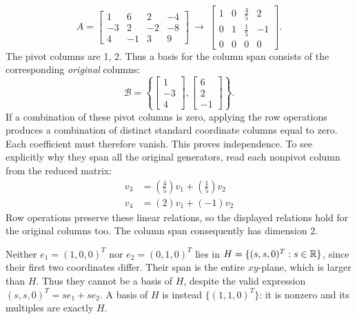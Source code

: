 \[A=\left[\begin{array}{rrrr}1&6&2&-4\\-3&2&-2&-8\\4&-1&3&9\end{array}\right]\ \longrightarrow\ \left[\begin{array}{rrrr}1&0&\frac{4}{5}&2\\0&1&\frac{1}{5}&-1\\0&0&0&0\end{array}\right].\]
The pivot columns are 1, 2. Thus a basis for the column span consists of the corresponding \emph{original} columns:
\[\mathcal B=\left\{\left[\begin{array}{r}1\\-3\\4\end{array}\right],\left[\begin{array}{r}6\\2\\-1\end{array}\right]\right\}.\]
If a combination of these pivot columns is zero, applying the row operations produces a combination of distinct standard coordinate columns equal to zero. Each coefficient must therefore vanish. This proves independence. To see explicitly why they span all the original generators, read each nonpivot column from the reduced matrix:
\[\begin{aligned}v_{3}&=(\frac{4}{5})v_{1}+(\frac{1}{5})v_{2}\\v_{4}&=(2)v_{1}+(-1)v_{2}\end{aligned}\]
Row operations preserve these linear relations, so the displayed relations hold for the original columns too. The column span consequently has dimension $2$.


Neither $e_1=(1,0,0)^T$ nor $e_2=(0,1,0)^T$ lies in
$H=\{(s,s,0)^T:s\in\mathbb{R}\}$, since their first two coordinates differ.
Their span is the entire $xy$-plane, which is larger than $H$.
Thus they cannot be a basis of $H$, despite the valid expression
$(s,s,0)^T=se_1+se_2$. A basis of $H$ is instead
$\{(1,1,0)^T\}$: it is nonzero and its multiples are exactly $H$.


